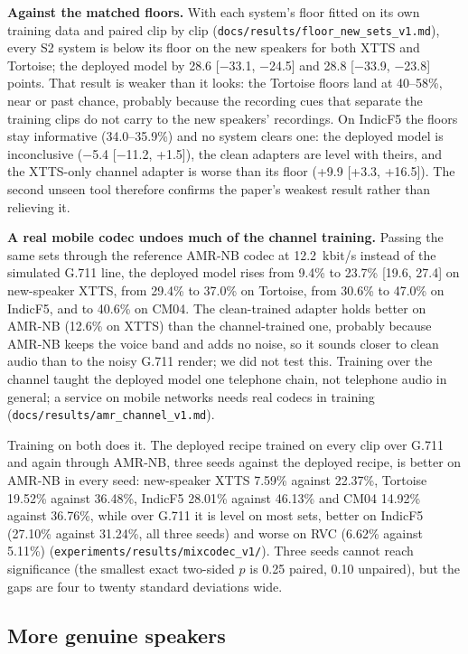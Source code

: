 \textbf{Against the matched floors.} With each system's floor fitted on its own
training data and paired clip by clip (\texttt{docs/results/floor\_new\_sets\_v1.md}),
every S2 system is below its floor on the new speakers for both XTTS and Tortoise; the
deployed model by 28.6 [$-$33.1, $-$24.5] and 28.8 [$-$33.9, $-$23.8] points. That
result is weaker than it looks: the Tortoise floors land at 40--58\%, near or past
chance, probably because the recording cues that separate the training clips do not
carry to the new speakers' recordings. On IndicF5 the floors stay informative (34.0--35.9\%)
and no system clears one: the deployed model is inconclusive ($-$5.4 [$-$11.2, +1.5]),
the clean adapters are level with theirs, and the XTTS-only channel adapter is worse
than its floor (+9.9 [+3.3, +16.5]). The second unseen tool therefore confirms the
paper's weakest result rather than relieving it.

\textbf{A real mobile codec undoes much of the channel training.} Passing the same sets
through the reference AMR-NB codec at 12.2~kbit/s instead of the simulated G.711 line,
the deployed model rises from 9.4\% to 23.7\% {\scriptsize[19.6, 27.4]} on new-speaker
XTTS, from 29.4\% to 37.0\% on Tortoise, from 30.6\% to 47.0\% on IndicF5, and to
40.6\% on CM04. The clean-trained adapter holds better on AMR-NB (12.6\% on XTTS) than
the channel-trained one, probably because AMR-NB keeps the voice band and adds no
noise, so it sounds closer to clean audio than to the noisy G.711 render; we did not test
this. Training over the channel
taught the deployed model one telephone chain, not telephone audio in general; a service
on mobile networks needs real codecs in training (\texttt{docs/results/amr\_channel\_v1.md}).

Training on both does it. The deployed recipe trained on every clip over G.711 and again
through AMR-NB, three seeds against the deployed recipe, is better on AMR-NB in every seed:
new-speaker XTTS 7.59\% against 22.37\%, Tortoise 19.52\% against 36.48\%, IndicF5
28.01\% against 46.13\% and CM04 14.92\% against 36.76\%, while over G.711 it is level on
most sets, better on IndicF5 (27.10\% against 31.24\%, all three seeds) and worse on RVC
(6.62\% against 5.11\%) (\texttt{experiments/results/mixcodec\_v1/}).
Three seeds cannot reach significance (the smallest exact two-sided $p$ is 0.25 paired,
0.10 unpaired), but the gaps are four to twenty standard deviations wide.

\subsection{More genuine speakers}
\label{sec:res-speakers}


